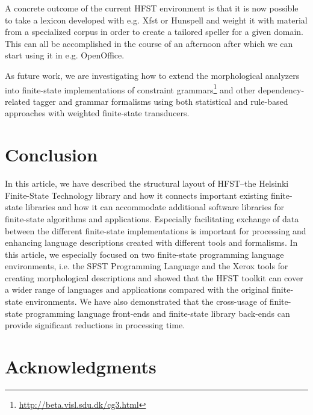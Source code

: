 \documentclass{llncs}
\begin{document}
A concrete outcome of the current HFST environment is that it is now possible to take 
a lexicon developed with e.g. Xfst or Hunspell and weight it with material from a specialized corpus 
in order to create a tailored speller for a given domain. This can all be accomplished in the course 
of an afternoon after which we can start using it in e.g. OpenOffice.

As future work, we are investigating how to extend the morphological analyzers 
into finite-state implementations of constraint 
grammars\footnote{\url{http://beta.visl.sdu.dk/cg3.html}} and other 
dependency-related tagger and grammar formalisms using both statistical
and rule-based approaches with weighted finite-state transducers. 

%
%
%

\section{Conclusion}\label{hfst:conclusion}
In this article, we have described the structural layout of HFST--the Helsinki Finite-State Technology library
and how it connects important existing finite-state libraries and how it can accommodate additional software
libraries for finite-state algorithms and applications. Especially facilitating exchange of data between the different
finite-state implementations is important for processing and enhancing language descriptions created with different
tools and formalisms. In this article, we especially focused on two finite-state programming language environments, 
i.e. the SFST Programming Language and the Xerox tools for creating morphological descriptions and showed
that the HFST toolkit can cover a wider range of languages and applications compared with the original finite-state environments. We have also demonstrated that the cross-usage of finite-state programming language 
front-ends and finite-state library back-ends can provide significant reductions in processing time.

\section*{Acknowledgments}



\end{document}
